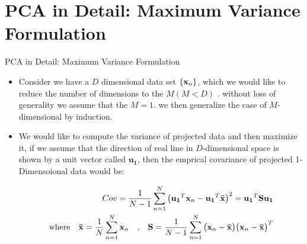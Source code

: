 \documentclass[compress,oilve]{beamer}
\begin{document}
\section{PCA in Detail: Maximum Variance Formulation}
\begin{frame}{PCA in Detail: Maximum Variance Formulation}
\begin{itemize}
\item Consider we have a $ D $ dimensional data set $\{ \mathbf{x_{\mathnormal n}}  \}$, which we would like to reduce the number of dimensions to  the $M  (M < D) $ . without loss of generality we assume that the $ M = 1 $. we then generalize the case of $M$-dimensional by induction.
\medskip
\item We would like to compute the variance of projected data and then maximize it, if we assume that the direction of real line in $D$-dimensional space is shown by a unit vector called $\mathbf{u_{1}}$, then the emprical covariance of projected 1-Dimensoional data would be:



\begin{equation}
\begin{aligned}	
Cov = \frac{1}{N - 1} \displaystyle\sum_{n=1}^{N} \big( \mathbf{u_{1}}^{T} \mathbf{x_{\mathnormal n}} - \mathbf{u_{1}}^{T } \mathbf{\bar{x}} \big) ^ {2} = \mathbf{u_{1}}^{T} \mathbf{S} \mathbf{u_{1}}\\ \text{where} \quad \mathbf{\bar{x}} =  \frac{1}{N} \displaystyle\sum_{n=1}^{N} \mathbf{x_{\mathnormal n}} \quad \text{,} \quad \mathbf{S} = \frac{1}{N-1} \displaystyle\sum_{n=1}^{N} \big( \mathbf{x_{\mathnormal n}}  -   \mathbf{\bar{x}} \big)  \big( \mathbf{x_{\mathnormal n}}  -   \mathbf{\bar{x}} \big) ^ {T} 
\end{aligned}
\end{equation}

\end{itemize}
\end{frame}
\end{document}

